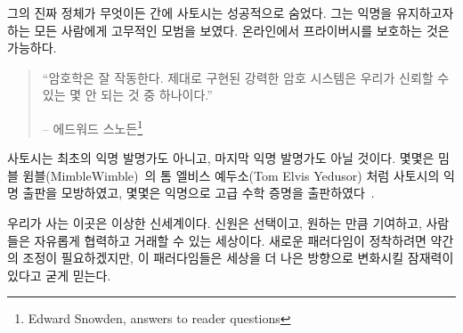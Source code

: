 \begin{comment}
Whatever his real identity might be, Satoshi was successful in hiding
it. He set an encouraging example for everyone who wishes to remain
anonymous: it is possible to have privacy online.
\end{comment}
그의 진짜 정체가 무엇이든 간에 사토시는 성공적으로 숨었다.
그는 익명을 유지하고자 하는 모든 사람에게 고무적인 모범을 보였다.
온라인에서 프라이버시를 보호하는 것은 가능하다.

\begin{quotation}\begin{samepage}
\enquote{암호학은 잘 작동한다. 제대로 구현된 강력한 암호 시스템은 우리가 신뢰할 수 있는 몇 안 되는 것 중 하나이다.}
\begin{flushright} -- 에드워드 스노든\footnote{Edward Snowden, answers to reader questions\cite{snowden}}
\end{flushright}\end{samepage}\end{quotation}

\begin{comment}
Satoshi wasn't the first pseudonymous or anonymous inventor, and he won't be the
last. Some have directly imitated this pseudonymous publication style, like Tom
Elvis Yedusor of MimbleWimble~\cite{mimblewimble-origin} fame, while others have
published advanced mathematical proofs while remaining completely
anonymous~\cite{4chan-math}.
\end{comment}
사토시는 최초의 익명 발명가도 아니고, 마지막 익명 발명가도 아닐 것이다.
몇몇은 밈블 윔블(MimbleWimble)~\cite{mimblewimble-origin}의 톰 엘비스 예두소(Tom Elvis Yedusor) 처럼 사토시의 익명 출판을 모방하였고, 
몇몇은 익명으로 고급 수학 증명을 출판하였다~\cite{4chan-math}.


\begin{comment}
It is a strange new world we are living in. A world where identity is
optional, contributions are accepted based on merit, and people can
collaborate and transact freely. It will take some adjustment to get
comfortable with these new paradigms, but I strongly believe that all of
this has the potential to change the world for the better.
\end{comment}
우리가 사는 이곳은 이상한 신세계이다. 
신원은 선택이고, 원하는 만큼 기여하고, 사람들은 자유롭게 협력하고 거래할 수 있는 세상이다.
새로운 패러다임이 정착하려면 약간의 조정이 필요하겠지만, 
이 패러다임들은 세상을 더 나은 방향으로 변화시킬 잠재력이 있다고 굳게 믿는다.

